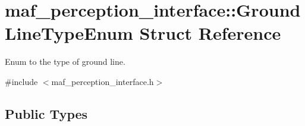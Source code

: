 \hypertarget{structmaf__perception__interface_1_1GroundLineTypeEnum}{}\section{maf\+\_\+perception\+\_\+interface\+:\+:Ground\+Line\+Type\+Enum Struct Reference}
\label{structmaf__perception__interface_1_1GroundLineTypeEnum}


Enum to the type of ground line.  




{\ttfamily \#include $<$maf\+\_\+perception\+\_\+interface.\+h$>$}

\subsection*{Public Types}

